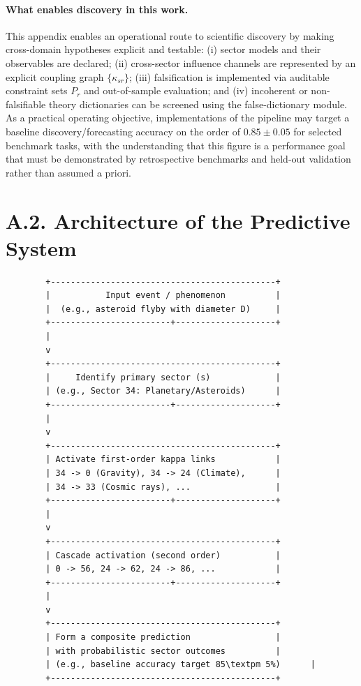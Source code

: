 \documentclass[13pt,a4paper]{article}
\begin{document}
	\paragraph{What enables discovery in this work.}
	This appendix enables an operational route to scientific discovery by making cross-domain hypotheses explicit and testable: (i) sector models and their observables are declared; (ii) cross-sector influence channels are represented by an explicit coupling graph $\{\kappa_{sr}\}$; (iii) falsification is implemented via auditable constraint sets $P_r$ and out-of-sample evaluation; and (iv) incoherent or non-falsifiable theory dictionaries can be screened using the false-dictionary module.
	As a practical operating objective, implementations of the pipeline may target a baseline discovery/forecasting accuracy on the order of $0.85\pm0.05$ for selected benchmark tasks, with the understanding that this figure is a performance goal that must be demonstrated by retrospective benchmarks and held-out validation rather than assumed a priori.
	
	\section*{A.2. Architecture of the Predictive System}
	
	\begin{lstlisting}
		+---------------------------------------------+
		|           Input event / phenomenon          |
		|  (e.g., asteroid flyby with diameter D)     |
		+------------------------+--------------------+
		|
		v
		+---------------------------------------------+
		|     Identify primary sector (s)             |
		| (e.g., Sector 34: Planetary/Asteroids)      |
		+------------------------+--------------------+
		|
		v
		+---------------------------------------------+
		| Activate first-order kappa links            |
		| 34 -> 0 (Gravity), 34 -> 24 (Climate),      |
		| 34 -> 33 (Cosmic rays), ...                 |
		+------------------------+--------------------+
		|
		v
		+---------------------------------------------+
		| Cascade activation (second order)           |
		| 0 -> 56, 24 -> 62, 24 -> 86, ...            |
		+------------------------+--------------------+
		|
		v
		+---------------------------------------------+
		| Form a composite prediction                 |
		| with probabilistic sector outcomes          |
		| (e.g., baseline accuracy target 85\textpm 5%)      |
		+---------------------------------------------+
	\end{lstlisting}
	
\end{document}
